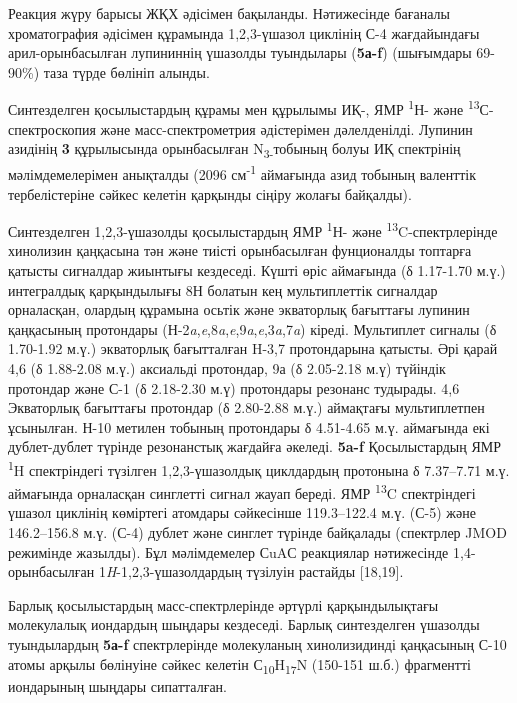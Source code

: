 \begin{multicols}{2}
Реакция жүру барысы ЖҚХ әдісімен бақыланды. Нәтижесінде бағаналы
хроматография әдісімен құрамында 1,2,3-үшазол циклінің С-4 жағдайындағы
арил-орынбасылған лупининнің үшазолды туындылары ({\bfseries 5а-f})
(шығымдары 69-90\%) таза түрде бөлініп алынды.

Синтезделген қосылыстардың құрамы мен құрылымы ИҚ-, ЯМР
\textsuperscript{1}Н- және \textsuperscript{13}С- спектроскопия және
масс-спектрометрия әдістерімен дәлелденілді. Лупинин азидінің {\bfseries 3}
құрылысында орынбасылған N\textsubscript{3-}тобының болуы ИҚ спектрінің
мәлімдемелерімен анықталды (2096 см\textsuperscript{-1} аймағында азид
тобының валенттік тербелістеріне сәйкес келетін қарқынды сіңіру жолағы
байқалды).

Синтезделген 1,2,3-үшазолды қосылыстардың ЯМР \textsuperscript{1}Н- және
\textsuperscript{13}C-спектрлерінде хинолизин қаңқасына тән және тиісті
орынбасылған фунционалды топтарға қатысты сигналдар жиынтығы кездеседі.
Күшті өріс аймағында (δ 1.17-1.70 м.ү.) интегралдық қарқындылығы 8Н
болатын кең мультиплеттік сигналдар орналасқан, олардың құрамына осьтік
және экваторлық бағыттағы лупинин қаңқасының протондары
(Н-2\emph{a},\emph{e},8\emph{a},\emph{e},9\emph{a},\emph{e},3\emph{a},7\emph{a})
кіреді. Мультиплет сигналы (δ 1.70-1.92 м.ү.) экваторлық бағытталған
H-3,7 протондарына қатысты. Әрі қарай 4,6 (δ 1.88-2.08 м.ү.) аксиальді
протондар, 9а (δ 2.05-2.18 м.ү) түйіндік протондар және С-1 (δ 2.18-2.30
м.ү) протондары резонанс тудырады. 4,6 Экваторлық бағыттағы протондар (δ
2.80-2.88 м.ү.) аймақтағы мультиплетпен ұсынылған. Н-10 метилен тобының
протондары δ 4.51-4.65 м.ү. аймағында екі дублет-дублет түрінде
резонанстық жағдайға әкеледі. {\bfseries 5a-f} Қосылыстардың ЯМР
\textsuperscript{1}H спектріндегі түзілген 1,2,3-үшазолдық циклдардың
протонына δ 7.37--7.71 м.ү. аймағында орналасқан синглетті сигнал жауап
береді. ЯМР \textsuperscript{13}C спектріндегі үшазол циклінің көміртегі
атомдары сәйкесінше 119.3--122.4 м.ү. (С-5) және 146.2--156.8 м.ү. (С-4)
дублет және синглет түрінде байқалады (спектрлер JMOD режимінде
жазылды). Бұл мәлімдемелер СuAС реакциялар нәтижесінде 1,4-орынбасылған
1\emph{H}-1,2,3-үшазолдардың түзілуін растайды {[}18,19{]}.

Барлық қосылыстардың масс-спектрлерінде әртүрлі қарқындылықтағы
молекулалық иондардың шыңдары кездеседі. Барлық синтезделген үшазолды
туындылардың {\bfseries 5а-f} спектрлерінде молекуланың хинолизидинді
қаңқасының С-10 атомы арқылы бөлінуіне сәйкес келетін
С\textsubscript{10}H\textsubscript{17}N (150-151 ш.б.) фрагментті
иондарының шыңдары сипатталған.


\end{multicols}
